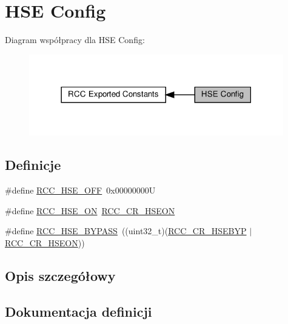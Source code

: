 \hypertarget{group___r_c_c___h_s_e___config}{}\section{H\+SE Config}
\label{group___r_c_c___h_s_e___config}
Diagram współpracy dla H\+SE Config\+:\nopagebreak
\begin{figure}[H]
\begin{center}
\leavevmode
\includegraphics[width=314pt]{group___r_c_c___h_s_e___config}
\end{center}
\end{figure}
\subsection*{Definicje}
\begin{DoxyCompactItemize}
\item 
\#define \hyperlink{group___r_c_c___h_s_e___config_ga1616626d23fbce440398578855df6f97}{R\+C\+C\+\_\+\+H\+S\+E\+\_\+\+O\+FF}~0x00000000U
\item 
\#define \hyperlink{group___r_c_c___h_s_e___config_gabc4f70a44776c557af20496b04d9a9db}{R\+C\+C\+\_\+\+H\+S\+E\+\_\+\+ON}~\hyperlink{group___peripheral___registers___bits___definition_gadb8228c9020595b4cf9995137b8c9a7d}{R\+C\+C\+\_\+\+C\+R\+\_\+\+H\+S\+E\+ON}
\item 
\#define \hyperlink{group___r_c_c___h_s_e___config_ga5ca515db2d5c4d5bdb9ee3d154df2704}{R\+C\+C\+\_\+\+H\+S\+E\+\_\+\+B\+Y\+P\+A\+SS}~((uint32\+\_\+t)(\hyperlink{group___peripheral___registers___bits___definition_gaa3288090671af5a959aae4d7f7696d55}{R\+C\+C\+\_\+\+C\+R\+\_\+\+H\+S\+E\+B\+YP} $\vert$ \hyperlink{group___peripheral___registers___bits___definition_gadb8228c9020595b4cf9995137b8c9a7d}{R\+C\+C\+\_\+\+C\+R\+\_\+\+H\+S\+E\+ON}))
\end{DoxyCompactItemize}


\subsection{Opis szczegółowy}


\subsection{Dokumentacja definicji}
\mbox{\label{group___r_c_c___h_s_e___config_ga5ca515db2d5c4d5bdb9ee3d154df2704}} 
